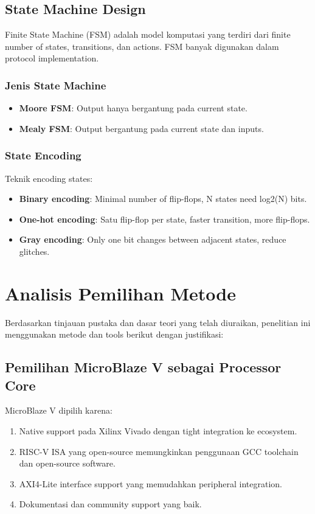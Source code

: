 \subsection{State Machine Design}

Finite State Machine (FSM) adalah model komputasi yang terdiri dari finite number of states, transitions, dan actions. FSM banyak digunakan dalam protocol implementation.

\subsubsection{Jenis State Machine}

\begin{itemize}
	\item \textbf{Moore FSM}: Output hanya bergantung pada current state.
	\item \textbf{Mealy FSM}: Output bergantung pada current state dan inputs.
\end{itemize}

\subsubsection{State Encoding}

Teknik encoding states:
\begin{itemize}
	\item \textbf{Binary encoding}: Minimal number of flip-flops, N states need log2(N) bits.
	\item \textbf{One-hot encoding}: Satu flip-flop per state, faster transition, more flip-flops.
	\item \textbf{Gray encoding}: Only one bit changes between adjacent states, reduce glitches.
\end{itemize}

\section{Analisis Pemilihan Metode}

Berdasarkan tinjauan pustaka dan dasar teori yang telah diuraikan, penelitian ini menggunakan metode dan tools berikut dengan justifikasi:

\subsection{Pemilihan MicroBlaze V sebagai Processor Core}

MicroBlaze V dipilih karena:
\begin{enumerate}
	\item Native support pada Xilinx Vivado dengan tight integration ke ecosystem.
	\item RISC-V ISA yang open-source memungkinkan penggunaan GCC toolchain dan open-source software.
	\item AXI4-Lite interface support yang memudahkan peripheral integration.
	\item Dokumentasi dan community support yang baik.
\end{enumerate}

